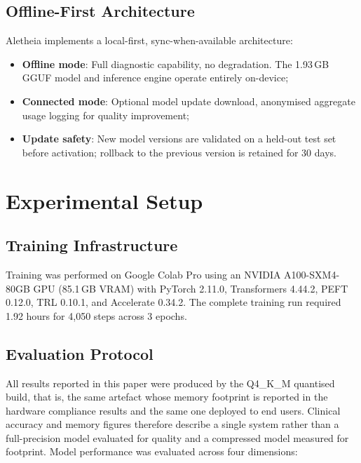 \documentclass[conference]{IEEEtran}
\begin{document}
\subsection{Offline-First Architecture}

Aletheia implements a local-first, sync-when-available architecture:
\begin{itemize}
  \item \textbf{Offline mode}: Full diagnostic capability, no
        degradation. The 1.93\,GB GGUF model and inference engine
        operate entirely on-device;
  \item \textbf{Connected mode}: Optional model update download,
        anonymised aggregate usage logging for quality improvement;
  \item \textbf{Update safety}: New model versions are validated on
        a held-out test set before activation; rollback to the
        previous version is retained for 30 days.
\end{itemize}

\section{Experimental Setup}
\label{sec:experiments}

\subsection{Training Infrastructure}

Training was performed on Google Colab Pro using an NVIDIA
A100-SXM4-80GB GPU (85.1\,GB VRAM) with PyTorch 2.11.0,
Transformers 4.44.2, PEFT 0.12.0, TRL 0.10.1, and
Accelerate 0.34.2. The complete training run required 1.92 hours
for 4{,}050 steps across 3 epochs.

\subsection{Evaluation Protocol}

All results reported in this paper were produced by the Q4\_K\_M
quantised build, that is, the same artefact whose memory footprint is
reported in the hardware compliance results and the same one deployed
to end users. Clinical accuracy and memory figures therefore describe a
single system rather than a full-precision model evaluated for quality
and a compressed model measured for footprint. Model performance was
evaluated across four dimensions:
\end{document}
